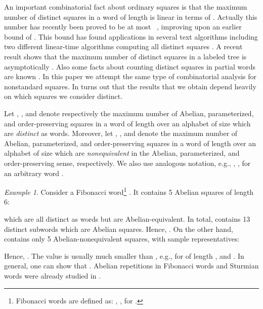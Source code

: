 \documentclass{article}
\theoremstyle{plain}
\theoremstyle{definition}
\theoremstyle{remark}
\newtheorem{example}[theorem]{Example}
\begin{document}
  An important combinatorial fact about ordinary squares is that the maximum number
  of distinct squares in a word of length  is linear in terms of .
  Actually this number has recently been proved to be at most ~\cite{DBLP:journals/dam/DezaFT15},
  improving upon an earlier bound of 
  \cite{fraenkel-simpson,DBLP:journals/jct/Ilie05,DBLP:journals/tcs/Ilie07}.
  This bound has found applications in several text algorithms
  \cite{DBLP:journals/tcs/CrochemoreIR09} including two different linear-time algorithms
  computing all distinct squares \cite{DBLP:journals/jcss/GusfieldS04,Extracting_TCS}.
  A recent result shows that the maximum number of distinct squares in a labeled tree is
  asymptotically  \cite{DBLP:conf/cpm/CrochemoreIKKRRTW12}.
  Also some facts about counting distinct squares in partial words are known
  \cite{DBLP:conf/dlt/Blanchet-SadriJM12,DBLP:journals/actaC/Blanchet-SadriMS09}.
  In this paper we attempt the same type of combinatorial analysis for nonstandard squares.
  In turns out that the results that we obtain depend heavily on which squares
  we consider distinct.

  Let , , and  denote respectively the maximum number of
  Abelian, parameterized, and order-preserving squares in a word of length  over
  an alphabet of size  which are \emph{distinct} as words.
  Moreover, let , , and  denote the maximum number of
  Abelian, parameterized, and order-preserving squares in a word of length  over
  an alphabet of size  which are \emph{nonequivalent} in the Abelian, parameterized,  and order-preserving sense, respectively.
  We also use analogous notation, e.g., , , for an arbitrary word .

  \begin{example}
    Consider a Fibonacci word\footnote{Fibonacci words are defined as: , ,  for .
    }  .
    It contains 5 Abelian squares of length 6:
    
    which are all distinct as words but are Abelian-equivalent.
    In total,  contains 13 distinct subwords which are Abelian squares.
    Hence, .
    On the other hand,  contains only 5 Abelian-nonequivalent squares, with sample representatives:
    
    Hence, .
    The value  is usually much smaller than , e.g., for  of length ,
     and
    .
    In general, one can show that .
    Abelian repetitions in Fibonacci words and Sturmian words were already studied in \cite{DBLP:conf/dlt/FiciLLLMP13}.
  \end{example}
\end{document}
